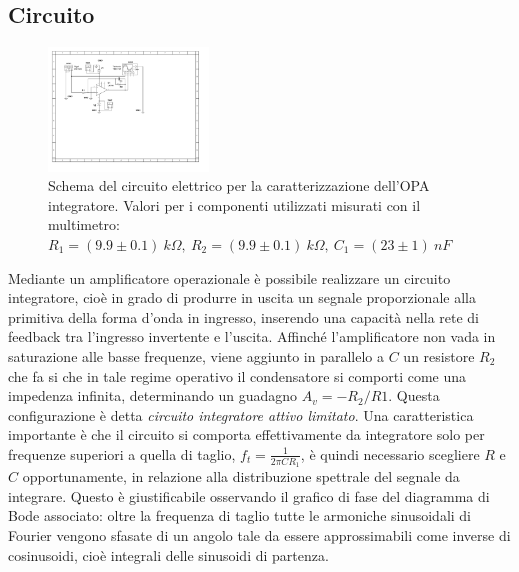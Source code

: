 \documentclass[journal]{IEEEtran}
\begin{document}
\subsection{\textbf{Circuito}}
\begin{figure}[H]%
\begin{center}
\includegraphics[width=0.38\textwidth]{sch-simulations/output/OPA-integratore.pdf}
\caption{Schema  del  circuito  elettrico  per  la  caratterizzazione  dell’OPA integratore.  Valori  per  i  componenti  utilizzati  misurati  con il multimetro: $R_1 = (9.9 \pm 0.1)\ k\Omega, \ R_2 = (9.9 \pm 0.1) \ k\Omega,\ C_1 = (23 \pm 1)\ nF$}
\label{fig:OPA-integ}
\end{center}
\end{figure}
Mediante un amplificatore operazionale è possibile realizzare un circuito integratore, cioè in grado di produrre in uscita un segnale proporzionale alla primitiva della forma d'onda in ingresso, inserendo una capacità nella rete di feedback tra l'ingresso invertente e l'uscita.
Affinché l'amplificatore non vada in saturazione alle basse frequenze, viene aggiunto in parallelo a $C$ un resistore $R_{2}$ che fa si che in tale regime operativo il condensatore si comporti come una impedenza infinita, determinando un guadagno $A_{v}=-R_{2}/R{1}$. Questa configurazione è detta \textit{circuito integratore attivo limitato}. 
Una caratteristica importante è che il circuito si comporta effettivamente da integratore solo per frequenze superiori a quella di taglio, $f_{t}=\frac{1}{2 \pi C R_{1} }$, è quindi necessario scegliere $R$ e $C$ opportunamente, in relazione alla distribuzione spettrale del segnale da integrare. Questo è giustificabile osservando il grafico di fase del diagramma di Bode associato: oltre la frequenza di taglio tutte le armoniche sinusoidali di Fourier vengono sfasate di un angolo tale da essere approssimabili come inverse di cosinusoidi, cioè integrali delle sinusoidi di partenza.
\end{document}
